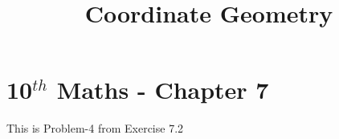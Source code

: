 \documentclass[12pt]{article}
\begin{document}
\begin{center}
\title{\textbf{Coordinate Geometry}}
\date{\vspace{-5ex}} %
\maketitle
\end{center}

\setcounter{page}{1}



\section*{10$^{th}$ Maths - Chapter 7}

This is Problem-4 from Exercise 7.2
\end{document}

